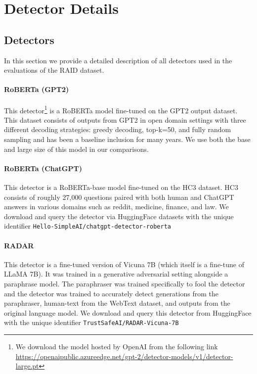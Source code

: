 \documentclass[11pt]{article}
\begin{document}
\section{Detector Details}
\label{app:detectors}

\subsection{Detectors}
In this section we provide a detailed description of all detectors used in the evaluations of the RAID dataset.

\paragraph{RoBERTa (GPT2)} \cite{solaiman-etal-2019} This detector\footnote{We download the model hosted by OpenAI from the following link \url{https://openaipublic.azureedge.net/gpt-2/detector-models/v1/detector-large.pt}} is a RoBERTa model \cite{liu2019roberta} fine-tuned on the GPT2 output dataset. This dataset consists of outputs from GPT2 in open domain settings with three different decoding strategies: greedy decoding, top-k=50, and fully random sampling and has been a baseline inclusion for many years. We use both the base and large size of this model in our comparisons.

\paragraph{RoBERTa (ChatGPT)} \cite{guo2023close} This detector is a RoBERTa-base model \cite{liu2019roberta} fine-tuned on the HC3 dataset. HC3 consists of roughly 27,000 questions paired with both human and ChatGPT answers in various domains such as reddit, medicine, finance, and law. We download and query the detector via HuggingFace datasets with the unique identifier \texttt{Hello-SimpleAI/chatgpt-detector-roberta}

\paragraph{RADAR} \cite{hu2023radar} This detector is a fine-tuned version of Vicuna 7B (which itself is a fine-tune of LLaMA 7B). It was trained in a generative adversarial setting alongside a paraphrase model. The paraphraser was trained specifically to fool the detector and the detector was trained to accurately detect generations from the paraphraser, human-text from the WebText dataset, and outputs from the original language model. We download and query this detector from HuggingFace with the unique identifier \texttt{TrustSafeAI/RADAR-Vicuna-7B}
\end{document}
